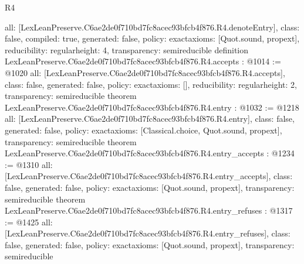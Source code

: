 \begin{lexlean}{R4}
\begin{coremodule}
{  all: [LexLeanPreserve.C6ae2de0f710bd7fc8acec93bfcb4f876.R4.denoteEntry],
  class: false,
  compiled: true,
  generated: false,
  policy: exact{axioms: [Quot.sound, propext]},
  reducibility: regular{height: 4},
  transparency: semireducible
}
definition LexLeanPreserve.C6ae2de0f710bd7fc8acec93bfcb4f876.R4.accepts : @1014 := @1020 {
  all: [LexLeanPreserve.C6ae2de0f710bd7fc8acec93bfcb4f876.R4.accepts],
  class: false,
  generated: false,
  policy: exact{axioms: []},
  reducibility: regular{height: 2},
  transparency: semireducible
}
theorem LexLeanPreserve.C6ae2de0f710bd7fc8acec93bfcb4f876.R4.entry : @1032 := @1218 {
  all: [LexLeanPreserve.C6ae2de0f710bd7fc8acec93bfcb4f876.R4.entry],
  class: false,
  generated: false,
  policy: exact{axioms: [Classical.choice, Quot.sound, propext]},
  transparency: semireducible
}
theorem LexLeanPreserve.C6ae2de0f710bd7fc8acec93bfcb4f876.R4.entry_accepts : @1234 := @1310 {
  all: [LexLeanPreserve.C6ae2de0f710bd7fc8acec93bfcb4f876.R4.entry_accepts],
  class: false,
  generated: false,
  policy: exact{axioms: [Quot.sound, propext]},
  transparency: semireducible
}
theorem LexLeanPreserve.C6ae2de0f710bd7fc8acec93bfcb4f876.R4.entry_refuses : @1317 := @1425 {
  all: [LexLeanPreserve.C6ae2de0f710bd7fc8acec93bfcb4f876.R4.entry_refuses],
  class: false,
  generated: false,
  policy: exact{axioms: [Quot.sound, propext]},
  transparency: semireducible
}


\end{coremodule}
\end{lexlean}
